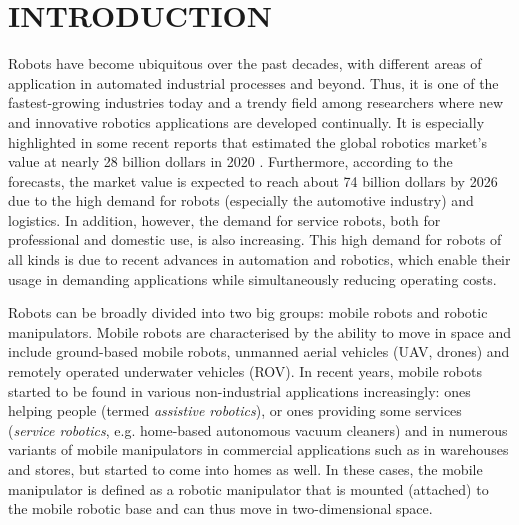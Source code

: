 \chapter{INTRODUCTION}
\label{chap:Intro}

Robots have become ubiquitous over the past decades, with different areas of application in automated industrial processes and beyond. Thus, it is one of the fastest-growing industries today and a trendy field among researchers where new and innovative robotics applications are developed continually. It is especially highlighted in some recent reports that estimated the global robotics market's value at nearly 28 billion dollars in 2020 \cite{MordorIntelligence2020}. Furthermore, according to the forecasts, the market value is expected to reach about 74 billion dollars by 2026 due to the high demand for robots (especially the automotive industry) and logistics. In addition, however, the demand for service robots, both for professional and domestic use, is also increasing. This high demand for robots of all kinds is due to recent advances in automation and robotics, which enable their usage in demanding applications while simultaneously reducing operating costs.

Robots can be broadly divided into two big groups: mobile robots and robotic manipulators. Mobile robots are characterised by the ability to move in space and include ground-based mobile robots, unmanned aerial vehicles (UAV, drones) and remotely operated underwater vehicles (ROV). In recent years, mobile robots started to be found in various non-industrial applications increasingly: ones helping people (termed \emph{assistive robotics}), or ones providing some services (\emph{service robotics}, e.g. home-based autonomous vacuum cleaners) and in numerous variants of mobile manipulators in commercial applications such as in warehouses and stores, but started to come into homes as well. In these cases, the mobile manipulator is defined as a robotic manipulator that is mounted (attached) to the mobile robotic base and can thus move in two-dimensional space.

